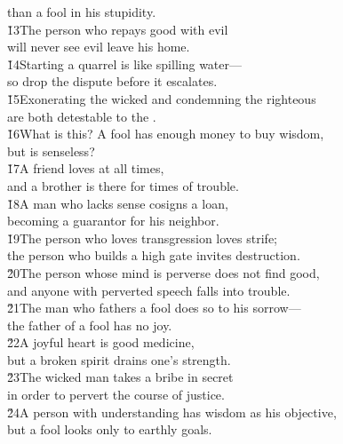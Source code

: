 \begin{poetry}
\poemll    than a fool in his stupidity. \\
\poeml \v{13}The person who repays good with evil \\
\poemll    will never see evil leave his home. \\
\poeml \v{14}Starting a quarrel is like spilling water--- \\
\poemll    so drop the dispute before it escalates. \\
\poeml \v{15}Exonerating the wicked and condemning the righteous \\
\poemll    are both detestable to the . \\
\poeml \v{16}What is this? A fool has enough money to buy wisdom, \\
\poemll    but is senseless? \\
\poeml \v{17}A friend loves at all times, \\
\poemll    and a brother is there for times of trouble. \\
\poeml \v{18}A man who lacks sense cosigns a loan, \\
\poemll    becoming a guarantor for his neighbor. \\
\poeml \v{19}The person who loves transgression loves strife; \\
\poemll    the person who builds a high gate invites destruction. \\
\poeml \v{20}The person whose mind is perverse does not find good, \\
\poemll    and anyone with perverted speech falls into trouble. \\
\poeml \v{21}The man who fathers a fool does so to his sorrow--- \\
\poemll    the father of a fool has no joy. \\
\poeml \v{22}A joyful heart is good medicine, \\
\poemll    but a broken spirit drains one's strength. \\
\poeml \v{23}The wicked man takes a bribe in secret \\
\poemll    in order to pervert the course of justice. \\
\poeml \v{24}A person with understanding has wisdom as his objective, \\
\poemll    but a fool looks only to earthly goals. \\

\end{poetry}
